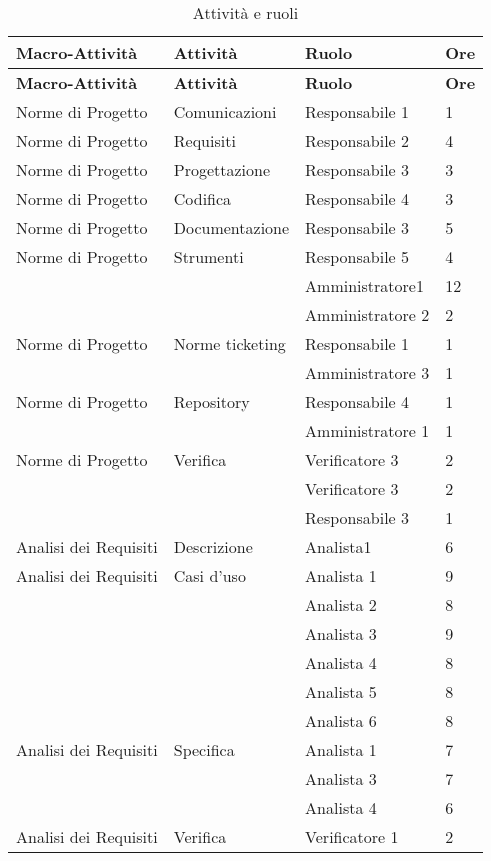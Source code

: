 {{	%
	\begin{longtable} [c]{| l | l | l | l |}
		 \hline
		 \textbf{Macro-Attivit\`{a}} & \textbf{Attivit\`{a}} & \textbf{Ruolo} & \textbf{Ore}\\
		 \hline
		 \endfirsthead
		 \hline
		 \textbf{Macro-Attivit\`{a}} & \textbf{Attivit\`{a}} & \textbf{Ruolo} & \textbf{Ore}\\
		 \hline
		\endhead
		 \hline
		 \endfoot
		 \hline
		 \caption{Attivit\`{a} e ruoli}
		 \endlastfoot
		Norme di Progetto & Comunicazioni & Responsabile 1 & 1\\
		Norme di Progetto & Requisiti & Responsabile 2 & 4\\
		Norme di Progetto & Progettazione & Responsabile 3 & 3\\
		Norme di Progetto & Codifica & Responsabile 4 & 3\\
		Norme di Progetto & Documentazione & Responsabile 3 & 5\\
		Norme di Progetto & Strumenti	&	Responsabile 5	&	4\\
		&	&	Amministratore1	&	12\\
		&	&	Amministratore 2	&	2\\
		Norme di Progetto & Norme ticketing &	Responsabile 1	&	1\\
		&	&	Amministratore 3 & 1\\
		Norme di Progetto & Repository &	Responsabile 4	&	1\\
		&	&	Amministratore 1	&	1\\
		Norme di Progetto & Verifica & Verificatore 3 & 2\\
		&	&	Verificatore 3 & 2\\
		&	&	Responsabile 3 & 1\\
		Analisi dei Requisiti & Descrizione & Analista1 & 6\\
		Analisi dei Requisiti & Casi d'uso & Analista 1 & 9\\
		&	&	Analista 2 & 8\\
		&	&	Analista 3 & 9\\
		&	&	Analista 4 & 8\\
		&	&	Analista 5 & 8\\
		&	&	Analista 6 & 8\\
		Analisi dei Requisiti & Specifica & Analista 1 & 7\\
		&	&	Analista 3 & 7\\
		&	&	Analista 4 & 6\\
		Analisi dei Requisiti & Verifica & Verificatore 1 & 2\\

\end{longtable}}}
